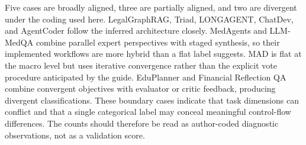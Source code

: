 \documentclass[a4paper,fleqn]{cas-dc}
\begin{document}
Five cases are broadly aligned, three are partially aligned, and two are
divergent under the coding used here. LegalGraphRAG, Triad, LONGAGENT,
ChatDev, and AgentCoder follow the inferred architecture closely. MedAgents
and LLM-MedQA combine parallel expert perspectives with staged synthesis, so
their implemented workflows are more hybrid than a flat label suggests. MAD
\citep{du2024multiagent_debate} is flat at the macro level but uses iterative
convergence rather than the explicit vote procedure anticipated by the guide.
EduPlanner \citep{zhang2024eduplanner} and Financial Reflection QA
\citep{fatemi2024financialqa} combine convergent objectives with evaluator or
critic feedback, producing divergent classifications. These boundary cases
indicate that task dimensions can conflict and that a single categorical label
may conceal meaningful control-flow differences. The counts should therefore
be read as author-coded diagnostic observations, not as a validation score.
\end{document}
